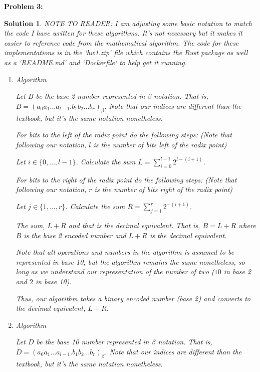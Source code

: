 \documentclass[12pt, letterpaper]{article}
\theoremstyle{nonumberplain}
\newtheorem{sol}{Solution}
\begin{document}
\newpage

\hspace{18pt}\textbf{Problem 3:} \medskip
\begin{sol}
	NOTE TO READER: I am adjusting some basic notation to match the code I have written for these algorithms. It's not necessary but it makes it easier to reference code from the mathematical algorithm. The code for these implementations is in the `hw1.zip` file which contains the Rust package as well as a `README.md` and `Dockerfile` to help get it running.
	\begin{enumerate}[label=\alph*)]
		\item Algorithm

		      Let $B$ be the base 2 number represented in $\beta$ notation. That is, $B = (a_0 a_1 \ldots a_{l-1}.b_1 b_2 \ldots b_r)_\beta$. Note that our indices are different than the textbook, but it's the same notation nonetheless.

		      For bits to the left of the radix point do the following steps: (Note that following our notation, $l$ is the number of bits left of the radix point)

		      Let $i\in \{0, \ldots, l-1\}$. Calculate the sum $L = \sum_{i=0}^{l-1}2^{l - (i+1)}$.

		      For bits to the right of the radix point do the following steps: (Note that following our notation, $r$ is the number of bits right of the radix point)

		      Let $j\in \{1, \ldots, r\}$. Calculate the sum $R = \sum_{j=1}^r 2^{-(i+1)}$.

		      The sum, $L+R$ and that is the decimal equivalent. That is, $B = L+R$ where $B$ is the base 2 encoded number and $L+R$ is the decimal equivalent.

		      Note that all operations and numbers in the algorithm is assumed to be represented in base 10, but the algorithm remains the same nonetheless, so long as we understand our representation of the number of two ($10$ in base 2 and $2$ in base 10).

		      Thus, our algorithm takes a binary encoded number (base 2) and converts to the decimal equivalent, $L+R$.


		\item Algorithm

		      Let $D$ be the base 10 number represented in $\beta$ notation. That is, $D = (a_0 a_1 \ldots a_{l-1}.b_1 b_2 \ldots b_r)_\beta$. Note that our indices are different than the textbook, but it's the same notation nonetheless.


\end{enumerate}
\end{sol}
\end{document}
